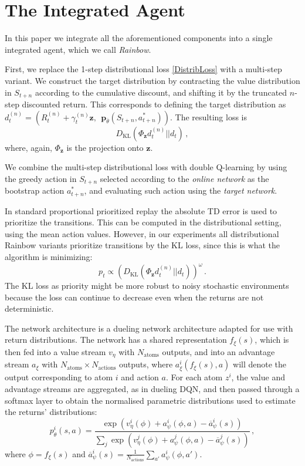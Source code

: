 \documentclass[letterpaper]{article} %
\def\z{\bm z}
\def\p{\bm p}
\begin{document}
\section{The Integrated Agent} \label{KS}

In this paper we integrate all the aforementioned components into a single integrated agent, which we call \textit{Rainbow}.

First, we replace the 1-step distributional loss \eqref{DistribLoss} with a multi-step variant. We construct the target distribution by contracting the value distribution in $S_{t+n}$ according to the cumulative discount, and shifting it by the truncated $n$-step discounted return. This corresponds to defining the target distribution as $d^{(n)}_t = (R^{(n)}_{t} + \gamma_t^{(n)} \z,~~ \p_{\overline{\theta}}(S_{t+n}, a^*_{t+n}))$. The resulting loss is
\[  %
D_{\text{KL}}(\Phi_{\z} d_{t}^{(n)} || d_t) \,,
\]  %
where, again, $\Phi_{\z}$ is the projection onto $\z$.

We combine the multi-step distributional loss with double Q-learning by
using the greedy action in $S_{t+n}$ selected according to the \emph{online network} as the bootstrap action $a^*_{t+n}$, and evaluating such action using the \emph{target network}.

In standard proportional prioritized replay \cite{schaul2015prioritized} the absolute TD error is used to prioritize the transitions. This can be computed in the distributional setting, using the mean action values. However, in our experiments all distributional Rainbow variants prioritize transitions by the KL loss, since this is what the algorithm is minimizing:
\[  %
p_t \propto \left( D_{\text{KL}}(\Phi_{\z}d_{t}^{(n)} || d_t) \right)^{\omega} \,.
\]  %
The KL loss as priority might be more robust to noisy stochastic environments because the loss can continue to decrease even when the returns are not deterministic.

The network architecture is a dueling network architecture adapted for use with return distributions. The network has a shared representation $f_{\xi}(s)$, which is then fed into a value stream $v_{\eta}$ with $N_{\text{atoms}}$ outputs, and into an advantage stream $a_{\xi}$ with $N_{\text{atoms}} \times N_\text{actions}$ outputs, where $a^i_{\xi}(f_{\xi}(s), a)$ will denote the output corresponding to atom $i$ and action $a$.  For each atom $z^i$, the value and advantage streams are aggregated, as in dueling DQN, and then passed through a softmax layer to obtain the normalised parametric distributions used to estimate the returns' distributions:
\[
p^i_{\theta}(s, a) = \frac{\exp(v^i_{\eta}(\phi) + a^i_{\psi}(\phi, a) - \overline{a}^i_{\psi}(s))}{\sum_j \exp(v^j_{\eta}(\phi) + a^j_{\psi}(\phi, a) - \overline{a}^j_{\psi}(s))} \,,
\]
where $\phi = f_{\xi}(s)$ and $\overline{a}^i_{\psi}(s) = \frac{1}{N_{\text{actions}}} \sum_{a'} a^i_{\psi}(\phi, a')$.
\end{document}
